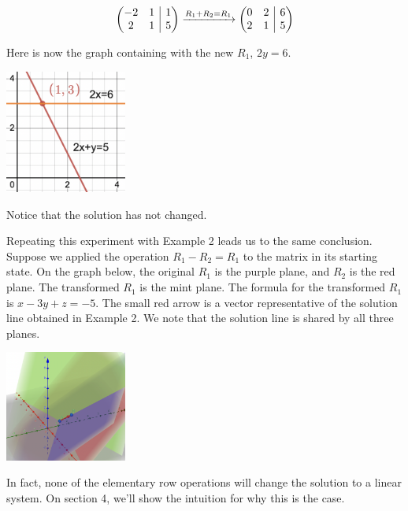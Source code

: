 \documentclass{article}
\begin{document}
\[
\left(\begin{array}{@{}cc|c@{}}
	-2 & 1 & 1 \\
	2 & 1 & 5
\end{array}\right)
\xrightarrow[]{R_1 + R_2 = R_1}
\left(\begin{array}{@{}cc|c@{}}
    0 & 2 & 6 \\
    2 & 1 & 5
\end{array}\right)
\]
\par \noindent Here is now the graph containing with the new \(R_1\), \(2y = 6\). 
\begin{center}
	\includegraphics[width=4cm]{post-op-1.png}
\end{center}
\par \noindent Notice that the solution has not changed. 
\newline
\par\noindent Repeating this experiment with Example 2 leads us to the same conclusion. Suppose we 
applied the operation \(R_1 - R_2 = R_1 \) to the matrix in its starting state. On the graph below, the original \(R_1\) is the purple plane, and \(R_2\) is the red plane. The transformed \(R_1\)
is the mint plane. The formula for the transformed \(R_1\) is \(x-3y+z=-5\). The small red arrow is a vector representative of the solution line obtained in Example 2. We note that the solution line is shared by all three planes.
\newline
\begin{center}
	\includegraphics[width=4cm]{post-op-2.png}
\end{center}
\par \noindent  In fact, none of the elementary row operations will  change the solution to a linear system. On section 4, we'll show the intuition for why this is the case.
\end{document}
